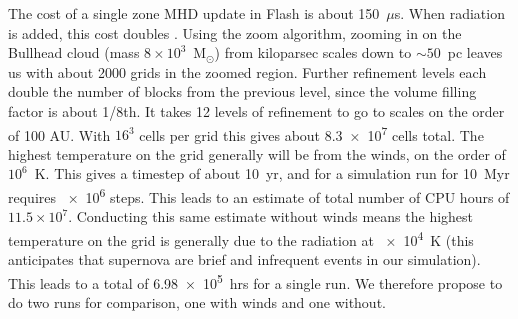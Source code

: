 \documentclass[11pt]{article}
\newcommand{\msun}{$\textrm{M}_{\odot}$}
\begin{document}

The cost of a single zone MHD update in Flash is about 150~$\mu$s. When radiation is added, this cost doubles \citep{wise_enzo+moray:_2011}. Using the zoom algorithm, zooming in on the Bullhead cloud (mass $8 \times 10^3$~{\msun}) from kiloparsec scales down to $\sim50$~pc leaves us with about 2000 grids in the zoomed region. Further refinement levels each double the number of blocks from the previous level, since the volume filling factor is about 1/8th. It takes 12 levels of refinement to go to scales on the order of 100 \si{AU}. With $16^3$ cells per grid this gives about \num{8.3e7} cells total. The highest temperature on the grid generally will be from the winds, on the order of $10^6$~K. This gives a timestep of about 10~yr, and for a simulation run for 10~Myr requires \num{e6} steps. This leads to an estimate of total number of CPU hours of $11.5 \times 10^7$. Conducting this same estimate without winds means the highest temperature on the grid is generally due to the radiation at \SI{e4}{K} (this anticipates that supernova are brief and infrequent events in our simulation). This leads to a total of \SI{6.98e5}{hrs} for a single run. We therefore propose to do two runs for comparison, one with winds and one without.




\end{document}
